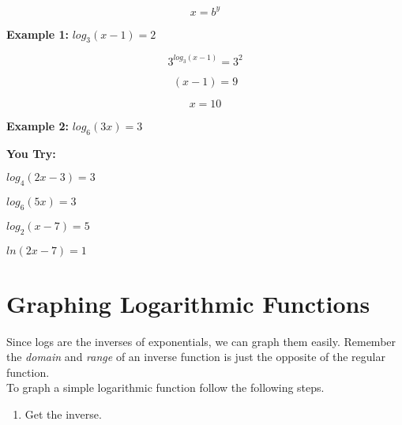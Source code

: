 \documentclass[12pt]{article}
\begin{document}
$$x=b^y$$

\hrulefill

\textbf{Example 1:} $log_{3}(x-1)=2$

$$3^{log_{3}(x-1)}=3^2$$

$$(x-1)=9$$

$$x=10$$

\textbf{Example 2:} $log_{6}(3x)=3$

\vspace{1in}

\hrulefill

\textbf{You Try:}\\

\begin{enumerate}
	\setlength\itemsep{1.5cm}
\begin{multicols}{2}

	\item $log_{4}(2x-3)=3$\\
	
	\item $log_{6}(5x)=3$\\
	
	\item $log_{2}(x-7)=5$\\
	
	\item $ln(2x-7)=1$\\
	
	
\end{multicols}
\end{enumerate}



\section{Graphing Logarithmic Functions} 

Since logs are the inverses of exponentials, we can graph them easily. Remember the \textit{domain} and \textit{range} of an inverse function is just the opposite of the regular function.\\


To graph a simple logarithmic function follow the following steps.

\begin{enumerate}
	\item Get the inverse.
\end{enumerate}
\end{document}
